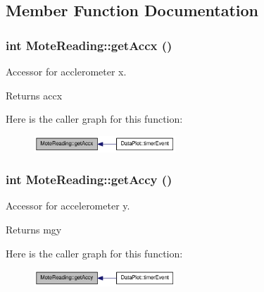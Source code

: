 \subsection{Member Function Documentation}
\hypertarget{classMoteReading_ad79a65f84dfaacc9b5c179fb66a5545f}{
\subsubsection[{getAccx}]{\setlength{\rightskip}{0pt plus 5cm}int MoteReading::getAccx ()}}
\label{classMoteReading_ad79a65f84dfaacc9b5c179fb66a5545f}


Accessor for acclerometer x. 

\begin{DoxyReturn}{Returns}
accx 
\end{DoxyReturn}


Here is the caller graph for this function:\nopagebreak
\begin{figure}[H]
\begin{center}
\leavevmode
\includegraphics[width=151pt]{classMoteReading_ad79a65f84dfaacc9b5c179fb66a5545f_icgraph}
\end{center}
\end{figure}


\hypertarget{classMoteReading_af918c7ca6c9fea98a3d608b61dbaffae}{
\subsubsection[{getAccy}]{\setlength{\rightskip}{0pt plus 5cm}int MoteReading::getAccy ()}}
\label{classMoteReading_af918c7ca6c9fea98a3d608b61dbaffae}


Accessor for accelerometer y. 

\begin{DoxyReturn}{Returns}
mgy 
\end{DoxyReturn}


Here is the caller graph for this function:\nopagebreak
\begin{figure}[H]
\begin{center}
\leavevmode
\includegraphics[width=151pt]{classMoteReading_af918c7ca6c9fea98a3d608b61dbaffae_icgraph}
\end{center}
\end{figure}


